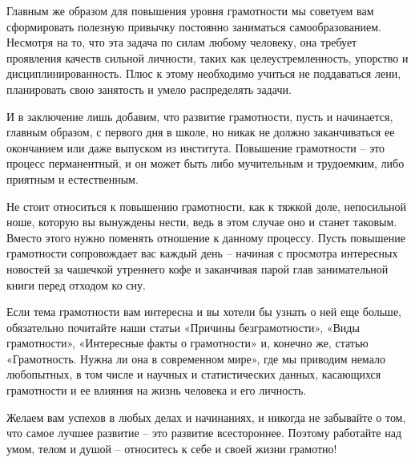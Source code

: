 Главным же образом для повышения уровня грамотности мы советуем вам сформировать полезную привычку постоянно заниматься самообразованием. Несмотря на то, что эта задача по силам любому человеку, она требует проявления качеств сильной личности, таких как целеустремленность, упорство и дисциплинированность. Плюс к этому необходимо учиться не поддаваться лени, планировать свою занятость и умело распределять задачи.

И в заключение лишь добавим, что развитие грамотности, пусть и начинается, главным образом, с первого дня в школе, но никак не должно заканчиваться ее окончанием или даже выпуском из института. Повышение грамотности – это процесс перманентный, и он может быть либо мучительным и трудоемким, либо приятным и естественным.

Не стоит относиться к повышению грамотности, как к тяжкой доле, непосильной ноше, которую вы вынуждены нести, ведь в этом случае оно и станет таковым. Вместо этого нужно поменять отношение к данному процессу. Пусть повышение грамотности сопровождает вас каждый день – начиная с просмотра интересных новостей за чашечкой утреннего кофе и заканчивая парой глав занимательной книги перед отходом ко сну.

Если тема грамотности вам интересна и вы хотели бы узнать о ней еще больше, обязательно почитайте наши статьи «Причины безграмотности», «Виды грамотности», «Интересные факты о грамотности» и, конечно же, статью «Грамотность. Нужна ли она в современном мире», где мы приводим немало любопытных, в том числе и научных и статистических данных, касающихся грамотности и ее влияния на жизнь человека и его личность.

Желаем вам успехов в любых делах и начинаниях, и никогда не забывайте о том, что самое лучшее развитие – это развитие всестороннее. Поэтому работайте над умом, телом и душой – относитесь к себе и своей жизни грамотно!